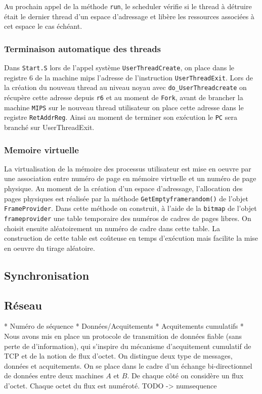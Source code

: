 \documentclass[11pt]{article}
\begin{document}
Au prochain appel de la méthode \texttt{run}, le scheduler vérifie si le thread à détruire était le dernier
thread d'un espace d'adressage et libère les ressources associées à cet espace le cas échéant.

\subsubsection{Terminaison automatique des threads}
Dans \texttt{Start.S} lors de l'appel système \texttt{UserThreadCreate}, on place dans le registre 6 de la machine mips l'adresse de l'instruction \texttt{UserThreadExit}.
Lors de la création du nouveau thread au niveau noyau avec \texttt{do\_UserThreadcreate} on récupère
cette adresse depuis \texttt{r6} et au moment de \texttt{Fork}, avant de brancher la machine \texttt{MIPS} sur
le nouveau thread utilisateur on place cette adresse dans le registre \texttt{RetAddrReg}. Ainsi au moment de terminer son exécution le \texttt{PC} sera branché sur UserThreadExit.


\subsubsection{Memoire virtuelle}
La virtualisation de la mémoire des processus utilisateur est mise en oeuvre par une association entre numéro
de page en mémoire virtuelle et un numéro de page physique. Au moment de la création d'un espace d'adressage, l'allocation des pages physiques est réalisée par la méthode \texttt{GetEmptyframerandom()} de l'objet \texttt{FrameProvider}.
Dans cette méthode on construit, à l'aide de la \texttt{bitmap} de l'objet \texttt{frameprovider} une table temporaire des numéros de cadres de pages libres.
On choisit ensuite aléatoirement un numéro de cadre dans cette table. La construction de cette table est coûteuse en temps d'exécution mais facilite la mise en oeuvre du tirage aléatoire.

\subsection{Synchronisation}

\subsection{Réseau}
* Numéro de séquence
* Données/Acquitements
* Acquitements cumulatifs
* 
Nous avons mis en place un protocole de transmition de données fiable (sans perte de d'information), qui s'inspire du mécanisme d'acquitement cumulatif de TCP et de la notion de flux d'octet. 
On distingue deux type de messages, données et acquitements. On se place dans le cadre d'un échange bi-directionnel de données entre deux machines $A$ et $B$.
De chaque côté on considère un flux d'octet. Chaque octet du flux est numéroté. TODO -> numsequence
\end{document}
